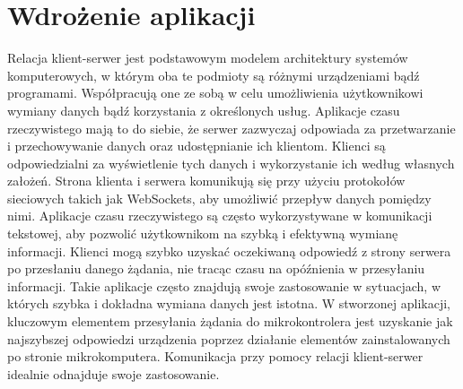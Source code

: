 \section{Wdrożenie aplikacji}
Relacja klient-serwer jest podstawowym modelem architektury systemów komputerowych, w którym oba te podmioty są różnymi urządzeniami bądź programami. Współpracują one ze sobą w celu umożliwienia użytkownikowi wymiany danych bądź korzystania z określonych usług. Aplikacje czasu rzeczywistego mają to do siebie, że serwer zazwyczaj odpowiada za przetwarzanie i przechowywanie danych oraz udostępnianie ich klientom. Klienci są odpowiedzialni za wyświetlenie tych danych i wykorzystanie ich według własnych założeń. Strona klienta i serwera komunikują się przy użyciu protokołów sieciowych takich jak WebSockets, aby umożliwić przepływ danych pomiędzy nimi. Aplikacje czasu rzeczywistego są często wykorzystywane w komunikacji tekstowej, aby pozwolić użytkownikom na szybką i efektywną wymianę informacji. Klienci mogą szybko uzyskać oczekiwaną odpowiedź z strony serwera po przesłaniu danego żądania, nie tracąc czasu na opóźnienia w przesyłaniu informacji. Takie aplikacje często znajdują swoje zastosowanie w sytuacjach, w których szybka i dokładna wymiana danych jest istotna. W stworzonej aplikacji, kluczowym elementem przesyłania żądania do mikrokontrolera jest uzyskanie jak najszybszej odpowiedzi urządzenia poprzez działanie elementów zainstalowanych po stronie mikrokomputera. Komunikacja przy pomocy relacji klient-serwer idealnie odnajduje swoje zastosowanie.

\newpage
